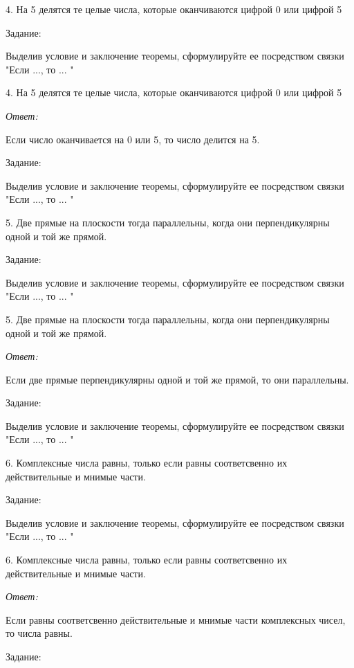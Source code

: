\documentclass[10pt]{beamer}
\theoremstyle{remark}
\theoremstyle{definition}
\begin{document}
\begin{frame}[allowframebreaks]
4. На 5 делятся те целые числа, которые оканчиваются цифрой 0 или цифрой 5


\framebreak 

Задание: 

Выделив условие и заключение теоремы, сформулируйте ее посредством связки "Если ..., то ... "

4. На 5 делятся те целые числа, которые оканчиваются цифрой 0 или цифрой 5

\textit{Ответ:} 

Если число оканчивается на 0 или 5, то число делится на 5.

\framebreak 

Задание: 

Выделив условие и заключение теоремы, сформулируйте ее посредством связки "Если ..., то ... "

5. Две прямые на плоскости тогда параллельны, когда они перпендикулярны одной и той же прямой.


\framebreak 

Задание: 

Выделив условие и заключение теоремы, сформулируйте ее посредством связки "Если ..., то ... "

5. Две прямые на плоскости тогда параллельны, когда они перпендикулярны одной и той же прямой.

\textit{Ответ:} 

Если две прямые перпендикулярны одной и той же прямой, то они параллельны.

\framebreak 

Задание: 

Выделив условие и заключение теоремы, сформулируйте ее посредством связки "Если ..., то ... "

6. Комплексные числа равны, только если равны соответсвенно их действительные и мнимые части.


\framebreak 

Задание: 

Выделив условие и заключение теоремы, сформулируйте ее посредством связки "Если ..., то ... "

6. Комплексные числа равны, только если равны соответсвенно их действительные и мнимые части.

\textit{Ответ:} 

Если равны соответсвенно действительные и мнимые части комплексных чисел, то числа равны.

\framebreak 

Задание: 


\end{frame}
\end{document}
